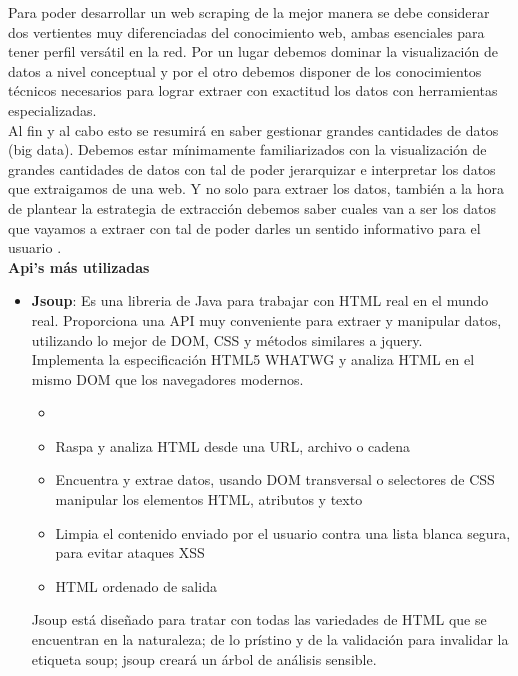 \begin{itemize}
			
			Para poder desarrollar un web scraping de la mejor manera se debe considerar  dos vertientes muy diferenciadas del conocimiento web, ambas esenciales para tener perfil versátil en la red. Por un lugar debemos dominar la visualización de datos a nivel conceptual y por el otro debemos disponer de los conocimientos técnicos necesarios para lograr extraer con exactitud los datos con herramientas especializadas. \\
			Al fin y al cabo esto se resumirá en saber gestionar grandes cantidades de datos (big data). Debemos estar mínimamente familiarizados con la visualización de grandes cantidades de datos con tal de poder jerarquizar e interpretar los datos que extraigamos de una web. Y no solo para extraer los datos, también a la hora de plantear la estrategia de extracción debemos saber cuales van a ser los datos que vayamos a extraer con tal de poder darles un sentido informativo para el usuario \cite{scraping}.\\
			
			\textbf{Api's más utilizadas}
			\begin{itemize}
				\item \textbf{Jsoup}: Es una libreria de Java para trabajar con HTML real en el mundo real. Proporciona una API muy conveniente para extraer y manipular datos, utilizando lo mejor de DOM, CSS y métodos similares a jquery.\\
				
				Implementa la especificación HTML5 WHATWG y analiza HTML en el mismo DOM que los navegadores modernos.
				\begin{itemize}
					\item 
					\item Raspa y analiza HTML desde una URL, archivo o cadena
					\item Encuentra y extrae datos, usando DOM transversal o selectores de CSS
					manipular los elementos HTML, atributos y texto
					\item Limpia el contenido enviado por el usuario contra una lista blanca segura, para evitar ataques XSS
					\item HTML ordenado de salida
				\end{itemize}
				
				Jsoup está diseñado para tratar con todas las variedades de HTML que se encuentran en la naturaleza; de lo prístino y de la validación para invalidar la etiqueta soup; jsoup creará un árbol de análisis sensible.\\
				

\end{itemize}
\end{itemize}
